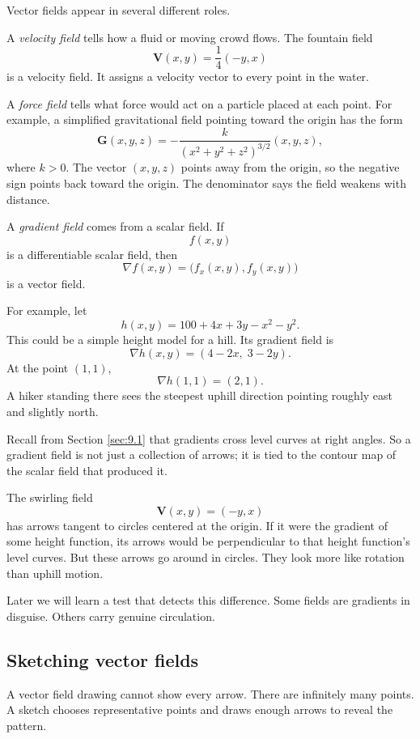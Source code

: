 Vector fields appear in several different roles.

A \emph{velocity field} tells how a fluid or moving crowd flows.  The fountain field
\[
    \mathbf V(x,y)=\frac14(-y,x)
\]
is a velocity field.  It assigns a velocity vector to every point in the water.

A \emph{force field} tells what force would act on a particle placed at each point.
For example, a simplified gravitational field pointing toward the origin has the form
\[
    \mathbf G(x,y,z)
    =
    -\frac{k}{(x^2+y^2+z^2)^{3/2}}(x,y,z),
\]
where \(k>0\).  The vector \((x,y,z)\) points away from the origin, so the negative sign
points back toward the origin.  The denominator says the field weakens with distance.

A \emph{gradient field} comes from a scalar field.  If
\[
    f(x,y)
\]
is a differentiable scalar field, then
\[
    \nabla f(x,y)=\bigl(f_x(x,y),f_y(x,y)\bigr)
\]
is a vector field.

For example, let
\[
    h(x,y)=100+4x+3y-x^2-y^2.
\]
This could be a simple height model for a hill.  Its gradient field is
\[
    \nabla h(x,y)=(4-2x,\;3-2y).
\]
At the point \((1,1)\),
\[
    \nabla h(1,1)=(2,1).
\]
A hiker standing there sees the steepest uphill direction pointing roughly east and
slightly north.

Recall from Section \ref{sec:9.1} that gradients cross level curves at right angles.
So a gradient field is not just a collection of arrows; it is tied to the contour map of
the scalar field that produced it.

\begin{example}
The swirling field
\[
    \mathbf V(x,y)=(-y,x)
\]
has arrows tangent to circles centered at the origin.  If it were the gradient of some
height function, its arrows would be perpendicular to that height function's level
curves.  But these arrows go around in circles.  They look more like rotation than
uphill motion.

Later we will learn a test that detects this difference.  Some fields are gradients in
disguise.  Others carry genuine circulation.
\end{example}

\subsection{Sketching vector fields}

A vector field drawing cannot show every arrow.  There are infinitely many points.
A sketch chooses representative points and draws enough arrows to reveal the pattern.

